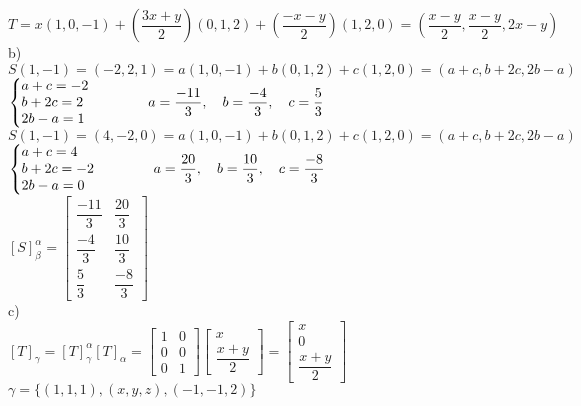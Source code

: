 \documentclass[12pt]{article}
\begin{document}
$T=x(1,0,-1)+(\dfrac{3x+y}{2})(0,1,2)+(\dfrac{-x-y}{2})(1,2,0)=(\dfrac{x-y}{2},\dfrac{x-y}{2},2x-y)$\\

\noindent b)\\

$S(1,-1)=(-2,2,1)=a(1,0,-1)+b(0,1,2)+c(1,2,0)=(a+c,b+2c,2b-a)$\\

$\left\{\begin{array}{@{}l@{}}a+c=-2\\b+2c=2\\2b-a=1\end{array}\right.\qquad\qquad a=\dfrac{-11}{3},\quad b=\dfrac{-4}{3},\quad c=\dfrac{5}{3}$\\

$S(1,-1)=(4,-2,0)=a(1,0,-1)+b(0,1,2)+c(1,2,0)=(a+c,b+2c,2b-a)$\\

$\left\{\begin{array}{@{}l@{}}a+c=4\\b+2c=-2\\2b-a=0\end{array}\right.\qquad\qquad a=\dfrac{20}{3},\quad b=\dfrac{10}{3},\quad c=\dfrac{-8}{3}$\\

$[S]^{\alpha}_{\beta}=\begin{bmatrix}\dfrac{-11}{3}&\dfrac{20}{3}\\\dfrac{-4}{3}&\dfrac{10}{3}\\\dfrac{5}{3}&\dfrac{-8}{3}\end{bmatrix}$\\

\noindent c)\\

$[T]_{\gamma}=[T]_{\gamma}^{\alpha}[T]_{\alpha}=\begin{bmatrix}1&0\\0&0\\0&1\end{bmatrix}\begin{bmatrix}x\\\dfrac{x+y}{2}\end{bmatrix}=\begin{bmatrix}x\\0\\\dfrac{x+y}{2}\end{bmatrix}$\\

$\gamma=\lbrace(1,1,1),(x,y,z),(-1,-1,2)\rbrace$\\
\end{document}
